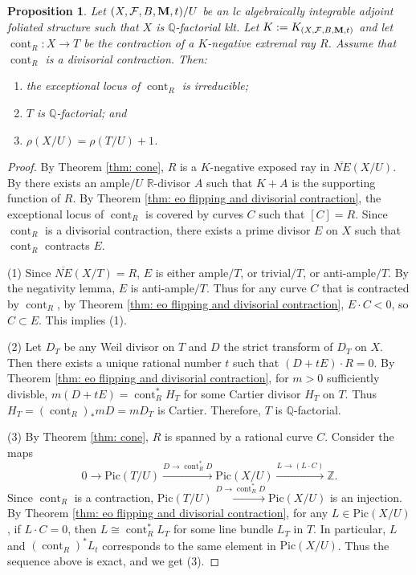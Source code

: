 \documentclass[12pt]{amsart}
\numberwithin{equation}{section}
\newcommand{\Mm}{{\bf{M}}}
\newcommand{\Qq}{\mathbb{Q}}
\newcommand{\Rr}{\mathbb{R}}
\newcommand{\cont}{\operatorname{cont}}
\newcommand{\Ff}{\mathcal{F}}
\newcommand{\Pic}{\mathrm{Pic}}
\newtheorem{prop}[thm]{Proposition}
\theoremstyle{definition}
\theoremstyle{definition}
\theoremstyle{definition}
\begin{document}
\begin{prop}\label{prop: q-factoriality preserved for divisorial contraction}
 Let $(X,\Ff,B,\Mm,t)/U$ be an lc algebraically integrable adjoint foliated structure such that $X$ is $\Qq$-factorial klt. Let $K:=K_{(X,\Ff,B,\Mm,t)}$ and let $\cont_R: X\rightarrow T$ be the contraction of a $K$-negative extremal ray $R$. Assume that $\cont_R$ is a divisorial contraction. Then:
 \begin{enumerate}
     \item the exceptional locus of $\cont_R$ is irreducible;
    \item $T$ is $\Qq$-factorial; and 
    \item $\rho(X/U)=\rho(T/U)+1$.
 \end{enumerate}
\end{prop}
\begin{proof}
By Theorem \ref{thm: cone}, $R$ is a $K$-negative exposed ray in $\overline{NE}(X/U)$. By \cite[Lemma 8.4.1]{CHLX23} there exists an ample$/U$ $\Rr$-divisor $A$ such that $K+A$ is the supporting function of $R$. By Theorem \ref{thm: eo flipping and divisorial contraction}, the exceptional locus of $\cont_R$ is covered by curves $C$ such that $[C]=R$. Since $\cont_R$ is a divisorial contraction, there exists a prime divisor $E$ on $X$ such that $\cont_R$ contracts $E$. 

(1) Since $\overline{NE}(X/T)=R$, $E$ is either ample$/T$, or trivial$/T$, or anti-ample$/T$. By the negativity lemma, $E$ is anti-ample$/T$. Thus for any curve $C$ that is contracted by $\cont_R$, by Theorem \ref{thm: eo flipping and divisorial contraction}, $E\cdot C<0$, so $C\subset E$. This implies (1). 

(2) Let $D_T$ be any Weil divisor on $T$ and $D$ the strict transform of $D_T$ on $X$. Then there exists a unique rational number $t$ such that $(D+tE)\cdot R=0$. By Theorem \ref{thm: eo flipping and divisorial contraction}, for $m>0$ sufficiently divisble, $m(D+tE)=\cont_R^\ast H_T$ for some Cartier divisor $H_T$ on $T$. Thus $H_T=(\cont_R)_\ast mD=mD_T$ is Cartier. Therefore, $T$ is $\Qq$-factorial.

(3) By Theorem \ref{thm: cone}, $R$ is spanned by a rational curve $C$. Consider the maps
$$0\rightarrow\Pic(T/U)\xrightarrow{D\rightarrow \cont_R^\ast D}\Pic(X/U)\xrightarrow{L\rightarrow (L\cdot C)}\mathbb Z.$$
Since $\cont_R$ is a contraction, $\Pic(T/U)\xrightarrow{D\rightarrow \cont_R^\ast D}\Pic(X/U)$ is an injection. By Theorem \ref{thm: eo flipping and divisorial contraction}, for any $L\in\Pic(X/U)$, if $L\cdot C=0$, then $L\cong\cont_R^\ast L_T$ for some line bundle $L_T$ in $T$. In particular, $L$ and $(\cont_R)^\ast L_t$ corresponds to the same element in $\Pic(X/U)$. Thus the sequence above is exact, and we get (3).
\end{proof}
\end{document}
